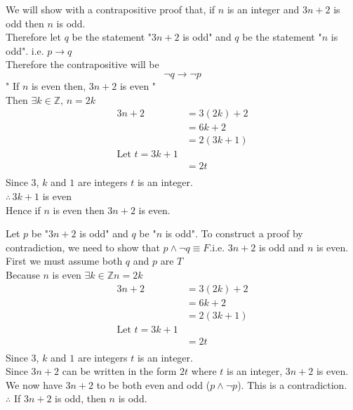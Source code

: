 \documentclass[12pt letter]{report}
\begin{document}
\begin{myproof}
	We will show with a contrapositive proof that, if $n$ is an integer and $3n + 2$ is odd then $n$ is odd. \\
	Therefore let $q$ be the statement "$3n + 2$ is odd" and $q$ be the statement "$n$ is odd". i.e. $p \to q$ \\
	Therefore the contrapositive will be
	\[
		\neg q \to \neg p
	\]
	" If $n$ is even then, $3n + 2$ is even "\\
	Then $\exists k \in \mathbb{Z},\, n = 2k$
	\begin{align*}
		3n + 2 & = 3 \left( 2k \right)  + 2 \\
		       & = 6k + 2                   \\
		       & = 2 \left( 3k + 1 \right)  \\
		\text{Let } t = 3k + 1              \\
		       & = 2t                       \\
	\end{align*}
	Since $3$, $k$ and $1$ are integers $t$ is an integer.\\
	$\therefore \, 3k + 1$ is even \\
	Hence if $n$ is even then $3n + 2$ is even. \\
\end{myproof}



\begin{myproof}
	Let $p$ be "$3n + 2$ is odd" and $q$ be "$n$ is odd". To construct a proof by contradiction, we need to show that
	$p \wedge \neg q \equiv F$.i.e. $3n + 2$ is odd and $n$ is even.\\
	First we must assume both $q$ and $p$ are $T$\\
	Because $n$ is even $\exists k \in \mathbb{Z} n = 2k$
	\begin{align*}
		3n + 2 & = 3 \left( 2k \right)  + 2 \\
		       & = 6k + 2                   \\
		       & = 2 \left( 3k + 1 \right)  \\
		\text{Let $t = 3k + 1$}             \\
		       & = 2t                       \\
	\end{align*}
	Since $3$, $k$ and $1$ are integers $t$ is an integer.\\
	Since $3n + 2$ can be written in the form $2t$ where $t$ is an integer, $3n + 2$ is even.\\
	We now have $3n + 2$ to be both even and odd ($p \wedge \neg p$). This is a contradiction.\\
	$\therefore$ If $3n + 2$ is odd, then $n$ is odd.
\end{myproof}
\end{document}
